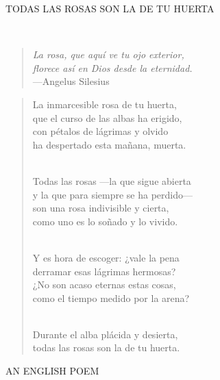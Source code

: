 \documentclass[a4paper, 12pt]{article}
\begin{document}
\pagebreak

\centerline{TODAS LAS ROSAS SON LA DE TU HUERTA}
~ 

\begin{quote}
    
\hspace*{\fill}\textit{La rosa, que aquí ve tu ojo exterior,\\\hspace*{\fill} florece así en Dios desde la eternidad.}\\
\hspace*{\fill}—Angelus Silesius
\end{quote}

\begin{verse}
    

La inmarcesible rosa de tu huerta,\\
que el curso de las albas ha erigido,\\
con pétalos de lágrimas y olvido\\
ha despertado esta mañana, muerta.\\
~ 

Todas las rosas —la que sigue abierta\\
y la que para siempre se ha perdido—\\
son una rosa indivisible y cierta,\\
como uno es lo soñado y lo vivido.\\
~ 

Y es hora de escoger: ¿vale la pena\\
derramar esas lágrimas hermosas?\\
¿No son acaso eternas estas cosas,\\
como el tiempo medido por la arena?\\
~ 

Durante el alba plácida y desierta,\\
todas las rosas son la de tu huerta.\\

\end{verse}

\pagebreak
\centerline{AN ENGLISH POEM}
~ 
\end{document}
